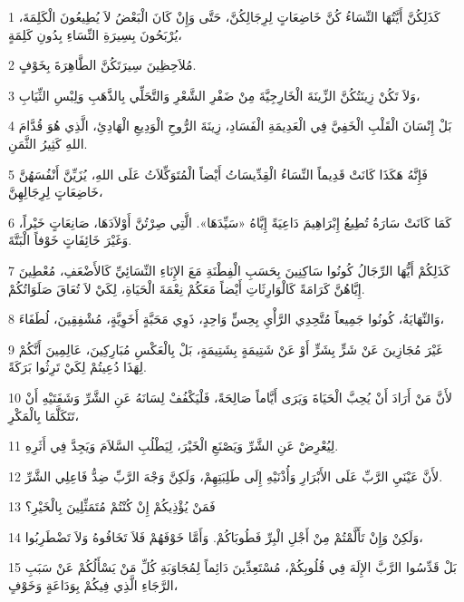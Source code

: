 \par 1 كَذَلِكُنَّ أَيَّتُهَا النِّسَاءُ كُنَّ خَاضِعَاتٍ لِرِجَالِكُنَّ، حَتَّى وَإِنْ كَانَ الْبَعْضُ لاَ يُطِيعُونَ الْكَلِمَةَ، يُرْبَحُونَ بِسِيرَةِ النِّسَاءِ بِدُونِ كَلِمَةٍ،
\par 2 مُلاَحِظِينَ سِيرَتَكُنَّ الطَّاهِرَةَ بِخَوْفٍ.
\par 3 وَلاَ تَكُنْ زِينَتُكُنَّ الزِّينَةَ الْخَارِجِيَّةَ مِنْ ضَفْرِ الشَّعْرِ وَالتَّحَلِّي بِالذَّهَبِ وَلِبْسِ الثِّيَابِ،
\par 4 بَلْ إِنْسَانَ الْقَلْبِ الْخَفِيَّ فِي الْعَدِيمَةِ الْفَسَادِ، زِينَةَ الرُّوحِ الْوَدِيعِ الْهَادِئِ، الَّذِي هُوَ قُدَّامَ اللهِ كَثِيرُ الثَّمَنِ.
\par 5 فَإِنَّهُ هَكَذَا كَانَتْ قَدِيماً النِّسَاءُ الْقِدِّيسَاتُ أَيْضاً الْمُتَوَكِّلاَتُ عَلَى اللهِ، يُزَيِّنَّ أَنْفُسَهُنَّ خَاضِعَاتٍ لِرِجَالِهِنَّ،
\par 6 كَمَا كَانَتْ سَارَةُ تُطِيعُ إِبْرَاهِيمَ دَاعِيَةً إِيَّاهُ «سَيِّدَهَا». الَّتِي صِرْتُنَّ أَوْلاَدَهَا، صَانِعَاتٍ خَيْراً، وَغَيْرَ خَائِفَاتٍ خَوْفاً الْبَتَّةَ.
\par 7 كَذَلِكُمْ أَيُّهَا الرِّجَالُ كُونُوا سَاكِنِينَ بِحَسَبِ الْفِطْنَةِ مَعَ الإِنَاءِ النِّسَائِيِّ كَالأَضْعَفِ، مُعْطِينَ إِيَّاهُنَّ كَرَامَةً كَالْوَارِثَاتِ أَيْضاً مَعَكُمْ نِعْمَةَ الْحَيَاةِ، لِكَيْ لاَ تُعَاقَ صَلَوَاتُكُمْ.
\par 8 وَالنِّهَايَةُ، كُونُوا جَمِيعاً مُتَّحِدِي الرَّأْيِ بِحِسٍّ وَاحِدٍ، ذَوِي مَحَبَّةٍ أَخَوِيَّةٍ، مُشْفِقِينَ، لُطَفَاءَ،
\par 9 غَيْرَ مُجَازِينَ عَنْ شَرٍّ بِشَرٍّ أَوْ عَنْ شَتِيمَةٍ بِشَتِيمَةٍ، بَلْ بِالْعَكْسِ مُبَارِكِينَ، عَالِمِينَ أَنَّكُمْ لِهَذَا دُعِيتُمْ لِكَيْ تَرِثُوا بَرَكَةً.
\par 10 لأَنَّ مَنْ أَرَادَ أَنْ يُحِبَّ الْحَيَاةَ وَيَرَى أَيَّاماً صَالِحَةً، فَلْيَكْفُفْ لِسَانَهُ عَنِ الشَّرِّ وَشَفَتَيْهِ أَنْ تَتَكَلَّمَا بِالْمَكْرِ،
\par 11 لِيُعْرِضْ عَنِ الشَّرِّ وَيَصْنَعِ الْخَيْرَ، لِيَطْلُبِ السَّلاَمَ وَيَجِدَّ فِي أَثَرِهِ.
\par 12 لأَنَّ عَيْنَيِ الرَّبِّ عَلَى الأَبْرَارِ وَأُذْنَيْهِ إِلَى طَلِبَتِهِمْ، وَلَكِنَّ وَجْهَ الرَّبِّ ضِدُّ فَاعِلِي الشَّرِّ.
\par 13 فَمَنْ يُؤْذِيكُمْ إِنْ كُنْتُمْ مُتَمَثِّلِينَ بِالْخَيْرِ؟
\par 14 وَلَكِنْ وَإِنْ تَأَلَّمْتُمْ مِنْ أَجْلِ الْبِرِّ فَطُوبَاكُمْ. وَأَمَّا خَوْفَهُمْ فَلاَ تَخَافُوهُ وَلاَ تَضْطَرِبُوا،
\par 15 بَلْ قَدِّسُوا الرَّبَّ الإِلَهَ فِي قُلُوبِكُمْ، مُسْتَعِدِّينَ دَائِماً لِمُجَاوَبَةِ كُلِّ مَنْ يَسْأَلُكُمْ عَنْ سَبَبِ الرَّجَاءِ الَّذِي فِيكُمْ بِوَدَاعَةٍ وَخَوْفٍ،
